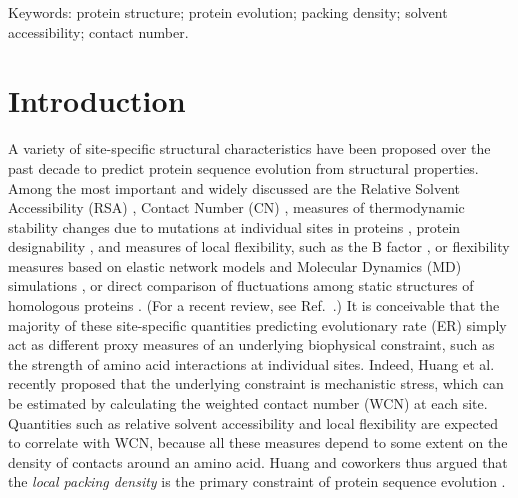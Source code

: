 \documentclass[12pt]{article}
\begin{document}
\noindent Keywords: protein structure; protein evolution; packing density; solvent accessibility; contact number.

\section*{Introduction}


A variety of site-specific structural characteristics have been proposed over the past decade to predict protein sequence evolution from structural properties. Among the most important and widely discussed are the Relative Solvent Accessibility (RSA) \cite{Overingtonetal1992, goldman_assessing_1998, MirnyShakhnovich1999, bustamante_solvent_2000, conant_solvent_2009, franzosa_structural_2009, ramsey_relationship_2011, scherrer_modeling_2012, meyer_integrating_2013, meyer_cross_species_2013, yeh_site-specific_2014, yeh_local_2014, shahmoradi_predicting_2014, sikosek_biophysics_2014, meyer_geometric_2015}, Contact Number (CN) \cite{rodionov_sequence_1998, hamelryck_amino_2005, liao_protein_2005, bloom_structural_2006, huang_mechanistic_2014, marcos_too_2015, yeh_site-specific_2014, yeh_local_2014, shahmoradi_predicting_2014}, measures of thermodynamic stability changes due to mutations at individual sites in proteins \cite{MirnyShakhnovich1999, DokholyanShakhnovich2001, Liberlesetal2012, echave_relationship_2014, Dasmehetal2014}, protein designability \cite{england_structural_2003, Jacksonetal2013}, and measures of local flexibility, such as the B factor \cite{liao_protein_2005, shih_evolutionary_2012, shahmoradi_predicting_2014}, or flexibility measures based on elastic network models \cite{liu_sequence_2012, huang_mechanistic_2014} and Molecular Dynamics (MD) simulations \cite{shahmoradi_predicting_2014}, or direct comparison of fluctuations among static structures of homologous proteins \cite{fuglebakk_measuring_2012,shahmoradi_predicting_2014, carvalho_comparison_2015}. (For a recent review, see Ref.~\cite{echave_causes_2016}.) It is conceivable that the majority of these site-specific quantities predicting evolutionary rate (ER) simply act as different proxy measures of an underlying biophysical constraint, such as the strength of amino acid interactions at individual sites. Indeed, Huang et al. \cite{huang_mechanistic_2014} recently proposed that the underlying constraint is mechanistic stress, which can be estimated by calculating the weighted contact number (WCN) at each site. Quantities such as relative solvent accessibility and local flexibility are expected to correlate with WCN, because all these measures depend to some extent on the density of contacts around an amino acid\cite{echave_causes_2016}. Huang and coworkers thus argued that the \emph{local packing density} is the primary constraint of protein sequence evolution \cite{huang_mechanistic_2014, yeh_site-specific_2014, yeh_local_2014}.
\end{document}
